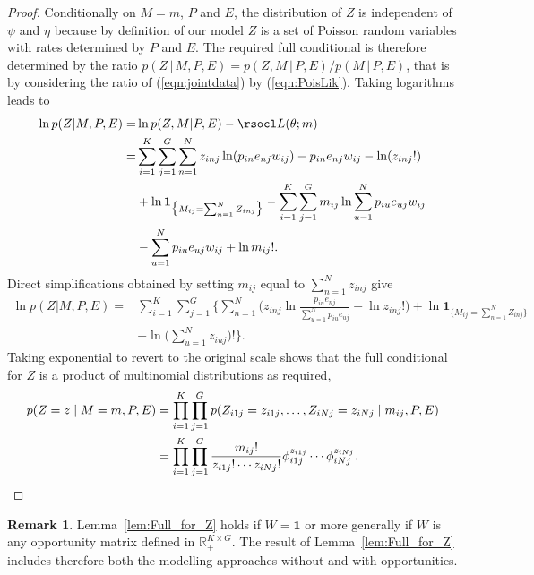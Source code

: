 \documentclass[11pt]{amsart}
\theoremstyle{definition}
\newtheorem{remark}[theorem]{Remark}
\begin{document}
\begin{proof} 
Conditionally on $M = m$, $P$ and $E$, the distribution of $Z$ is
independent of $\psi$ and $\eta$ because by definition of our model
$Z$ is a set of Poisson random variables with rates determined by $P$
and $E$. The required full conditional is therefore determined by the
ratio $p(Z\,|\,M, P, E) = p(Z, M\,|\, P,E)/p(M\,|\,P, E)$, that is by
considering the ratio of (\ref{eqn:jointdata}) by
(\ref{eqn:PoisLik}). Taking logarithms leads to
\begin{align*}
    \ln p(Z|M, P, E) 
  =&
    \ln p(Z, M|P, E) - \rsocl L(\theta; m) \\
  =&
    \sum_{i=1}^K \sum_{j=1}^G \sum_{n=1}^N z_{inj}
     \ln(p_{in}e_{nj}w_{ij}) - 
     p_{in}e_{nj}w_{ij} - \ln(z_{inj}!) \\
    & + \ln \mathbf{1}_{\big\{M_{ij} =
     \sum_{n=1}^N Z_{inj}\big\}}
     -\sum_{i=1}^K \sum_{j=1}^G m_{ij}\ln \sum_{u=1}^N
      p_{iu}e_{uj}w_{ij} \\
    & - \sum_{u=1}^N p_{iu}e_{uj}w_{ij} + \ln m_{ij}!.
\end{align*}
Direct simplifications obtained by  setting $m_{ij}$ equal to
$\sum_{n=1}^N  z_{inj}$ give
\begin{align*}
    \ln p(Z|M, P, E) 
  =&
    \sum_{i=1}^K \sum_{j=1}^G\Big\{
       \sum_{n=1}^N \Big(
           z_{inj} \ln\frac{p_{in}e_{nj}}{\sum_{u=1}^N
           p_{iu}e_{uj}} - \ln z_{inj}!
       \Big) + 
       \ln \mathbf{1}_{\big\{M_{ij} = \sum_{n=1}^N Z_{inj}
     \big\}} \\
     &+ \ln \big(\sum_{u=1}^N z_{iuj}\big)!
   \Big\}.
\end{align*}
Taking exponential to revert to the original scale shows that
the full conditional for $Z$ is a product of multinomial
distributions as required,
\begin{align}
       p(Z = z\mid M = m, P, E) 
     &= 
       \prod_{i=1}^K \prod_{j=1}^G
       p(Z_{i1j} = z_{i1j}, \ldots, Z_{iNj} =
       z_{iNj}\mid m_{ij}, P, E) \notag\\ 
     &=
       \prod_{i=1}^K \prod_{j=1}^G
       \frac{m_{ij}!}{z_{i1j}!\cdots z_{iNj}!}
        \phi_{i1j}^{z_{i1j}} \cdots
       \phi_{iNj}^{z_{iNj}}. \notag\qedhere
\end{align}
\end{proof}

\begin{remark} Lemma~\ref{lem:Full_for_Z} holds if $W=\mathbf 1$ or
more generally if $W$ is any opportunity matrix defined in $\mathbb
R^{K\times G}_+$. The result of Lemma~\ref{lem:Full_for_Z} includes
therefore both the modelling approaches without and with
opportunities.
\end{remark}
\end{document}
